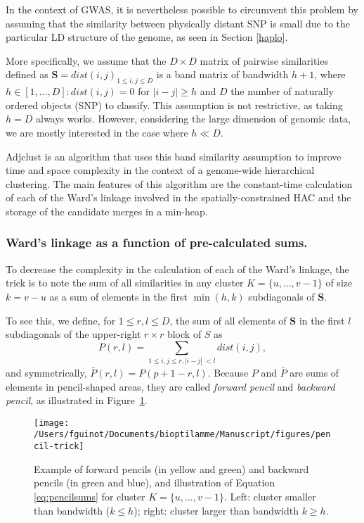 \documentclass[]{book}
\begin{document}
In the context of GWAS, it is nevertheless possible to circumvent this
problem by assuming that the similarity between physically distant SNP
is small due to the particular LD structure of the genome, as seen in
Section \ref{haplo}.

More specifically, we assume that the \(D\times D\) matrix of pairwise
similarities defined as \(\mathbf{S} = dist(i,j)_{1 \leq i,j\leq D}\) is a band
matrix of bandwidth \(h + 1\), where \(h \in [1,\dots,D]: dist(i,j) = 0\)
for \(|i-j| \geq h\) and \(D\) the number of naturally ordered objects (SNP)
to classify. This assumption is not restrictive, as taking \(h = D\)
always works. However, considering the large dimension of genomic data,
we are mostly interested in the case where \(h \ll D\).

Adjclust is an algorithm that uses this band similarity assumption to
improve time and space complexity in the context of a genome-wide
hierarchical clustering. The main features of this algorithm are the
constant-time calculation of each of the Ward's linkage involved in the
spatially-constrained HAC and the storage of the candidate merges in a
min-heap.

\hypertarget{wards-linkage-as-a-function-of-pre-calculated-sums.}{%
\subsubsection{Ward's linkage as a function of pre-calculated sums.}\label{wards-linkage-as-a-function-of-pre-calculated-sums.}}

To decrease the complexity in the calculation of each of the Ward's
linkage, the trick is to note the sum of all similarities in any cluster
\(K=\{u, \dots , v-1\}\) of size \(k = v-u\) as a sum of elements in the
first \(\min(h,k)\) subdiagonals of \(\mathbf{S}\).

To see this, we define, for \(1 \leq r,l \leq D\), the sum of all elements
of \(\mathbf{S}\) in the first \(l\) subdiagonals of the upper-right \(r \times r\)
block of \(S\) as
\[P(r,l) = \sum_{1 \leq i,j \leq r, |i-j| \ < l} dist(i,j) ,\] and
symmetrically, \(\bar{P}(r, l) = P(p+1-r, l)\). Because \(P\) and \(\bar{P}\)
are sums of elements in pencil-shaped areas, they are called \emph{forward pencil} and \emph{backward pencil}, as illustrated in Figure~\ref{fig:penciltrick}.



\begin{figure}

{\centering \texttt{[image: /Users/fguinot/Documents/bioptilamme/Manuscript/figures/pencil-trick]} 

}

\caption{Example of forward pencils (in yellow and green) and backward pencils (in green and blue), and illustration of Equation \eqref{eq:pencilsums} for cluster \(K=\{u, \dots , v-1\}\). Left: cluster smaller than bandwidth (\(k \leq h\)); right: cluster larger than bandwidth \(k \geq h\).}\label{fig:penciltrick}
\end{figure}
\end{document}
